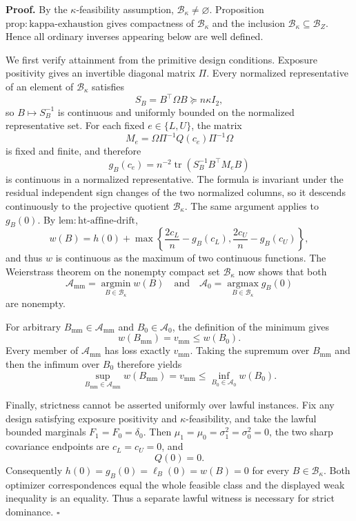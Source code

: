 \textbf{Proof.}
By the \(\kappa\)-feasibility assumption, \(\mathcal B_\kappa\neq\varnothing\).  Proposition \(\mathrm{prop{:}kappa\mbox{-}exhaustion}\) gives compactness of \(\mathcal B_\kappa\) and the inclusion \(\mathcal B_\kappa\subseteq\mathcal B_Z\).  Hence all ordinary inverses appearing below are well defined.

We first verify attainment from the primitive design conditions.  Exposure positivity gives an invertible diagonal matrix \(\Pi\).  Every normalized representative of an element of \(\mathcal B_\kappa\) satisfies
\[
S_B=B^{\top}\Omega B\succeq n\kappa I_2,
\]
so \(B\mapsto S_B^{-1}\) is continuous and uniformly bounded on the normalized representative set.  For each fixed \(e\in\{L,U\}\), the matrix
\[
M_e=\Omega\Pi^{-1}Q(c_e)\Pi^{-1}\Omega
\]
is fixed and finite, and therefore
\[
g_B(c_e)=n^{-2}\operatorname{tr}\!\left(S_B^{-1}B^{\top}M_eB\right)
\]
is continuous in a normalized representative.  The formula is invariant under the residual independent sign changes of the two normalized columns, so it descends continuously to the projective quotient \(\mathcal B_\kappa\).  The same argument applies to \(g_B(0)\).  By \(\mathrm{lem{:}ht\mbox{-}affine\mbox{-}drift}\),
\[
w(B)=h(0)+\max\left\{\frac{2c_L}{n}-g_B(c_L),\frac{2c_U}{n}-g_B(c_U)\right\},
\]
and thus \(w\) is continuous as the maximum of two continuous functions.  The Weierstrass theorem on the nonempty compact set \(\mathcal B_\kappa\) now shows that both
\[
\mathcal A_{\mathrm{mm}}=\operatorname*{argmin}_{B\in\mathcal B_\kappa}w(B)
\quad\text{and}\quad
\mathcal A_0=\operatorname*{argmax}_{B\in\mathcal B_\kappa}g_B(0)
\]
are nonempty.

For arbitrary \(B_{\mathrm{mm}}\in\mathcal A_{\mathrm{mm}}\) and \(B_0\in\mathcal A_0\), the definition of the minimum gives
\[
w(B_{\mathrm{mm}})=v_{\mathrm{mm}}\le w(B_0).
\]
Every member of \(\mathcal A_{\mathrm{mm}}\) has loss exactly \(v_{\mathrm{mm}}\).  Taking the supremum over \(B_{\mathrm{mm}}\) and then the infimum over \(B_0\) therefore yields
\[
\sup_{B_{\mathrm{mm}}\in\mathcal A_{\mathrm{mm}}}w(B_{\mathrm{mm}})
=v_{\mathrm{mm}}
\le
\inf_{B_0\in\mathcal A_0}w(B_0).
\]

Finally, strictness cannot be asserted uniformly over lawful instances.  Fix any design satisfying exposure positivity and \(\kappa\)-feasibility, and take the lawful bounded marginals \(F_1=F_0=\delta_0\).  Then \(\mu_1=\mu_0=\sigma_1^2=\sigma_0^2=0\), the two sharp covariance endpoints are \(c_L=c_U=0\), and
\[
Q(0)=0.
\]
Consequently \(h(0)=g_B(0)=\ell_B(0)=w(B)=0\) for every \(B\in\mathcal B_\kappa\).  Both optimizer correspondences equal the whole feasible class and the displayed weak inequality is an equality.  Thus a separate lawful witness is necessary for strict dominance. \(\square\)